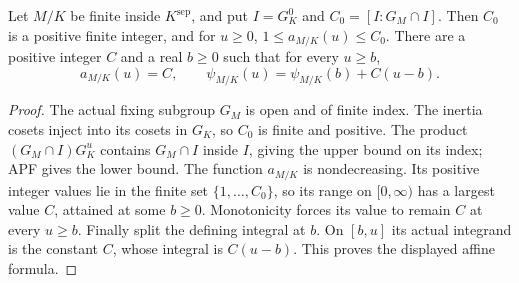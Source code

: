 \begin{lemma}
\label{fw:apf-finite-slope}
\leanok
Let $M/K$ be finite inside $K^{\mathrm{sep}}$, and put
$I=G_K^0$ and $C_0=[I:G_M\cap I]$.
Then $C_0$ is a positive finite integer, and for $u\geq0$,
$1\leq a_{M/K}(u)\leq C_0$. There are a positive integer $C$ and a
real $b\geq0$ such that for every $u\geq b$,
\[
 a_{M/K}(u)=C,\qquad
 \psi_{M/K}(u)=\psi_{M/K}(b)+C(u-b).
\]
\end{lemma}
\begin{proof}
The actual fixing subgroup $G_M$ is open and of finite index. The
inertia cosets inject into its cosets in $G_K$, so $C_0$ is finite and
positive. The product $(G_M\cap I)G_K^u$ contains $G_M\cap I$ inside
$I$, giving the upper bound on its index; APF gives the lower bound.
The function $a_{M/K}$ is nondecreasing. Its positive integer values
lie in the finite set $\{1,\ldots,C_0\}$, so its range on $[0,\infty)$
has a largest value $C$, attained at some $b\geq0$. Monotonicity
forces its value to remain $C$ at every $u\geq b$.
Finally split the defining integral at $b$. On $[b,u]$ its actual
integrand is the constant $C$, whose integral is $C(u-b)$.
This proves the displayed affine formula.
\end{proof}

